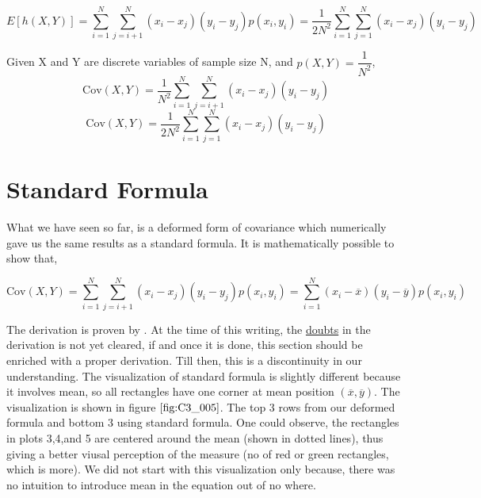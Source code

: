 \documentclass[float=false,crop=false]{standalone}
\begin{document}
    \begin{equation}
E[h(X,Y)] =  \sum\limits_{i=1}^N\sum\limits_{j=i+1}^{N}(x_i - x_j)(y_i - y_j)p(x_i , y_i) =  \dfrac{1}{2N^2}\sum\limits_{i=1}^N\sum\limits_{j=1}^{N}(x_i - x_j)(y_i - y_j) \label{eq:C3_003}
\end{equation}

\begin{tcolorbox}[colback=green!5,colframe=green!40!black,title=Covariance of discrete X and Y with p(X\,Y) uniform]
Given X and Y are discrete variables of sample size N, and $p(X,Y) = \dfrac{1}{N^2}$, 
\begin{equation}
    \mathrm{Cov}(X,Y) = \dfrac{1}{N^2}\sum\limits_{i=1}^N\sum\limits_{j=i+1}^{N}(x_i - x_j)(y_i - y_j) \label{eq:C3_004}
\end{equation}
\begin{equation}
    \mathrm{Cov}(X,Y) = \dfrac{1}{2N^2}\sum\limits_{i=1}^N\sum\limits_{j=1}^{N}(x_i - x_j)(y_i - y_j) \label{eq:C3_005}
\end{equation}
\end{tcolorbox}
    \section{Standard Formula}\label{standard-formula}

What we have seen so far, is a deformed form of covariance which
numerically gave us the same results as a standard formula. It is
mathematically possible to show that,

\begin{equation}
\mathrm{Cov}(X,Y) = \sum\limits_{i=1}^N\sum\limits_{j=i+1}^{N}(x_i - x_j)(y_i - y_j)p(x_i , y_i) = \sum\limits_{i=1}^{N}(x_i - \overline{x})(y_i - \overline{y}) p(x_i , y_i)
\end{equation}

The derivation is proven by \citet{yuli2012}. 
    At the time of this writing, the
\href{https://math.stackexchange.com/questions/2982674/single-to-double-summation-via-vector-matrix-problem}{doubts}
in the derivation is not yet cleared, if and once it is done, this
section should be enriched with a proper derivation. Till then, this is
a discontinuity in our understanding. The visualization of standard
formula is slightly different because it involves mean, so all
rectangles have one corner at mean position
\((\overline{x},\overline{y})\). The visualization is shown in figure
\(\ref{fig:C3_005}\). The top 3 rows from our deformed formula and
bottom 3 using standard formula. One could observe, the rectangles in
plots 3,4,and 5 are centered around the mean (shown in dotted lines),
thus giving a better viusal perception of the measure (no of red or
green rectangles, which is more). We did not start with this
visualization only because, there was no intuition to introduce mean in
the equation out of no where.
\end{document}
